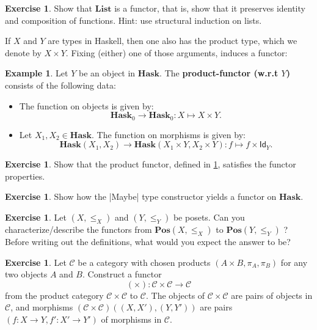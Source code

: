\documentclass[a4paper,10pt]{scrartcl}
\theoremstyle{plain}
\theoremstyle{definition}
\newtheorem{exa}[thm]{Example}
\newtheorem{exer}[thm]{Exercise}
\newcommand{\cfont}[1]{\ensuremath{\mathsf{#1}}}
\newcommand{\Cat}[1]{\mathcal{#1}}
\newcommand{\CC}{\Cat{C}}
\newcommand{\Catb}[1]{\mathbf{#1}}
\newcommand{\List}{\Catb{List}}
\newcommand{\POS}{\Catb{Pos}}
\newcommand{\HASK}{\Catb{Hask}}
\newcommand{\Ob}[1]{{#1}_0}
\newcommand{\CHom}[3]{{#1}(#2,#3)}
\newcommand{\Id}[1][]{\cfont{Id}_{#1}}
\begin{document}
\begin{exer}
  Show that $\List$ is a  functor, that is, show that it preserves identity and composition of functions.
  Hint: use structural induction on lists.
\end{exer}

If $X$ and $Y$ are types in Haskell, then one also has the product type, which we denote by $X\times Y$. Fixing (either) one of those arguments, induces a functor:
\begin{exa}\label{example:functor_haskproduct} Let $Y$ be an object in $\HASK$. The \textbf{product-functor (w.r.t $Y$)} consists of the following data:
\begin{itemize}
\item The function on objects is given by:
\[
\Ob{\HASK} \to \Ob{\HASK}: X\mapsto X\times Y.
\]
\item Let $X_1,X_2 \in \HASK$. The function on morphisms is given by:
\[
 \CHom{\HASK}{X_1}{X_2} \to \CHom{\HASK}{X_1 \times Y}{X_2\times Y}: f\mapsto f\times \Id[Y].
\]
\end{itemize}
\end{exa}

\begin{exer} Show that the product functor, defined in \cref{example:functor_haskproduct}, satisfies the functor properties.
\end{exer}

\begin{exer} Show how the |Maybe| type constructor yields a functor on $\HASK$.
\end{exer}




\begin{exer}\label{ex:poset_functors} Let $(X,\leq_X)$ and $(Y,\leq_Y)$ be posets. Can you characterize/describe the functors from $\POS(X,\leq_X)$ to $\POS(Y,\leq_Y)$  ? Before writing out the definitions, what would you expect the answer to be?
\end{exer}

\begin{exer}
  Let $\CC$ be a category with chosen products $(A\times B, \pi_A, \pi_B)$ for any two objects $A$ and $B$.
  Construct a functor
  \[ (\times) : \CC\times \CC \to \CC\]
  from the product category $\CC\times \CC$ to $\CC$.
  The objects of $\CC\times \CC$ are pairs of objects in $\CC$, and morphisms $\CHom{(\CC\times\CC)}{(X,X')}{(Y,Y')}$ are pairs $(f : X \to Y, f' : X' \to Y')$ of morphisms in $\CC$.
\end{exer}
\end{document}
